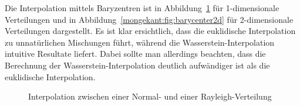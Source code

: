 Die Interpolation mittels Baryzentren
ist in Abbildung~\ref{mongekant:fig:barycenter1d} für 1-dimensionale Verteilungen
und in Abbildung~\ref{mongekant:fig:barycenter2d} für 2-dimensionale Verteilungen
dargestellt.
Es ist klar ersichtlich,
dass die euklidische Interpolation
zu unnatürlichen Mischungen führt,
während die Wasserstein-Interpolation
intuitive Resultate liefert.
Dabei sollte man allerdings beachten,
dass die Berechnung der Wasserstein-Interpolation
deutlich aufwändiger ist als die euklidische Interpolation.

\begin{figure}
\centering
{}
\caption{Interpolation zwischen einer {\color{red}Normal-} und
einer {\color{blue}Rayleigh-}Verteilung}
\label{mongekant:fig:barycenter1d}
\end{figure}



